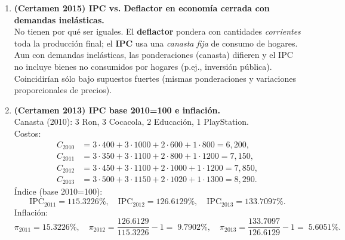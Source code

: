 \documentclass[11pt,addpoints]{article}
\begin{document}
\begin{enumerate}
\textbf{(b) Tasa de crecimiento del PIB real (base 2020).}
\[
g_{2021}=\frac{92{,}000}{84{,}000}-1=\boxed{9.5238\%}.
\]

\textbf{(c) Deflactor del PIB.}
\[
\text{Deflactor}_{2020}=\boxed{100\%},\qquad 
\text{Deflactor}_{2021}=\frac{99{,}300}{92{,}000}\cdot100=\boxed{107.9348\%}.
\]

\textbf{(d) IPC (canasta A,B con cantidades 2020).}\\
Costo base \(=500\cdot100+10\cdot2000=70{,}000\). Costo 2021 \(=540\cdot100+9\cdot2000=72{,}000\).
\[
\text{IPC}_{2020}=\boxed{100\%},\qquad \text{IPC}_{2021}=\frac{72{,}000}{70{,}000}\cdot100=\boxed{102.8571\%}.
\]

\textbf{(e) Inflación por deflactor vs. por IPC.}
\[
\pi^{\text{defl}}_{2021}=\frac{107.9348}{100}-1=\boxed{7.9348\%},\qquad
\pi^{\text{IPC}}_{2021}=\frac{102.8571}{100}-1=\boxed{2.8571\%}.
\]



\newpage %
\vspace*{0.1cm} %

\item \textbf{(Certamen 2015) IPC vs. Deflactor en economía cerrada con demandas inelásticas.}\\
No tienen por qué ser iguales. El \textbf{deflactor} pondera con cantidades \emph{corrientes} toda la producción final; el \textbf{IPC} usa una \emph{canasta fija} de consumo de hogares. Aun con demandas inelásticas, las ponderaciones (canasta) difieren y el IPC no incluye bienes no consumidos por hogares (p.ej., inversión pública). Coincidirían sólo bajo supuestos fuertes (mismas ponderaciones y variaciones proporcionales de precios).

\item \textbf{(Certamen 2013) IPC base 2010=100 e inflación.}\\
Canasta (2010): \(3\) Ron, \(3\) Cocacola, \(2\) Educación, \(1\) PlayStation.\\
Costos: 
\[
\begin{aligned}
C_{2010}&=3\cdot400+3\cdot1000+2\cdot600+1\cdot800=6{,}200,\\
C_{2011}&=3\cdot350+3\cdot1100+2\cdot800+1\cdot1200=7{,}150,\\
C_{2012}&=3\cdot450+3\cdot1100+2\cdot1000+1\cdot1200=7{,}850,\\
C_{2013}&=3\cdot500+3\cdot1150+2\cdot1020+1\cdot1300=8{,}290.
\end{aligned}
\]
Índice (base 2010=100): 
\[
\text{IPC}_{2011}=\boxed{115.3226\%},\quad \text{IPC}_{2012}=\boxed{126.6129\%},\quad \text{IPC}_{2013}=\boxed{133.7097\%}.
\]
Inflación:
\[
\pi_{2011}=15.3226\%,\quad 
\pi_{2012}=\frac{126.6129}{115.3226}-1=\;9.7902\%,\quad 
\pi_{2013}=\frac{133.7097}{126.6129}-1=\;5.6051\%.
\]


\end{enumerate}
\end{document}
